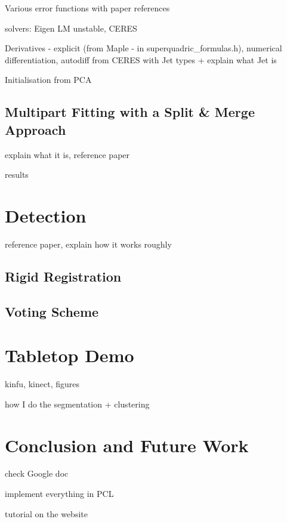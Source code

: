 \documentclass{article}
\begin{document}
Various error functions with paper references

solvers: Eigen LM unstable, CERES

Derivatives - explicit (from Maple - in superquadric\_formulas.h), numerical differentiation, autodiff from CERES with Jet types + explain what Jet is

Initialisation from PCA

\subsection {Multipart Fitting with a Split \& Merge Approach}

explain what it is, reference paper

results




\section {Detection}
\label{sec:detection}

reference paper, explain how it works roughly

\subsection {Rigid Registration}

\subsection {Voting Scheme}


\section {Tabletop Demo}
\label{sec:tabletop_demo}

kinfu, kinect, figures

how I do the segmentation + clustering


\section {Conclusion and Future Work}
\label{sec:conclusion}

check Google doc

implement everything in PCL

tutorial on the website




\end{document}
